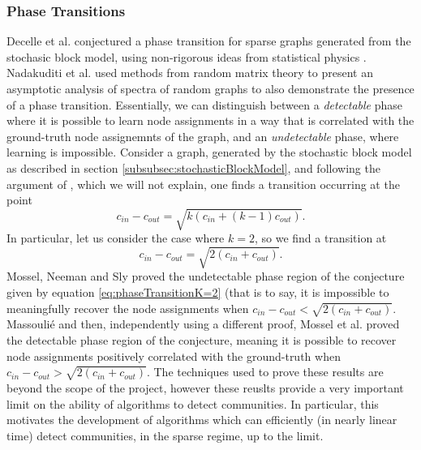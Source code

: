 \documentclass[12pt]{article}
\numberwithin{equation}{section}
\begin{document}
\subsubsection{Phase Transitions}
\label{subsubsec:phaseTransitions}

Decelle et al. \cite{DKM+11} conjectured a phase transition for sparse graphs generated from the stochasic block model, using non-rigorous ideas from statistical physics \cite{MNS12}. Nadakuditi et al. \cite{NN12} used methods from random matrix theory to present an asymptotic analysis of spectra of random graphs to also demonstrate the presence of a phase transition. Essentially, we can distinguish between a \textit{detectable} phase where it is possible to learn node assignments in a way that is correlated with the ground-truth node assignemnts of the graph, and an \textit{undetectable} phase, where learning is impossible. Consider a graph, generated by the stochastic block model as described in section \ref{subsubsec:stochasticBlockModel}, and following the argument of \cite{NN12}, which we will not explain, one finds a transition occurring at the point
\begin{equation}
\label{eq:phaseTransitionK}
	c_{in} - c_{out} = \sqrt{k(c_{in} + (k-1)c_{out})}.
\end{equation}
In particular, let us consider the case where $k = 2$, so we find a transition at
\begin{equation}
\label{eq:phaseTransitionK=2}
	c_{in} - c_{out} = \sqrt{2(c_{in} + c_{out})}.
\end{equation}
Mossel, Neeman and Sly \cite{MNS12} proved the undetectable phase region of the conjecture given by equation \ref{eq:phaseTransitionK=2} (that is to say, it is impossible to meaningfully recover the node assignments when $ c_{in} - c_{out} < \sqrt{2(c_{in} + c_{out})}$. Massouli\'e \cite{Mas13} and then, independently using a different proof, Mossel et al. \cite{MNS13b} proved the detectable phase region of the conjecture, meaning it is possible to recover node assignments positively correlated with the ground-truth when $ c_{in} - c_{out} > \sqrt{2(c_{in} + c_{out})}$. The techniques used to prove these results are beyond the scope of the project, however these reuslts provide a very important limit on the ability of algorithms to detect communities. In particular, this motivates the development of algorithms which can efficiently (in nearly linear time) detect communities, in the sparse regime, up to the limit.
\end{document}
